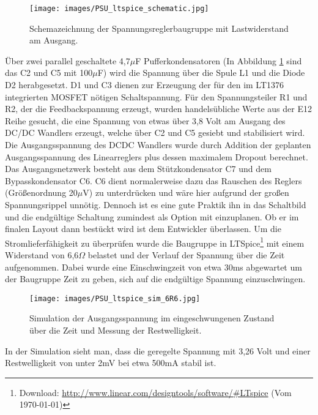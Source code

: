 \documentclass{scrartcl}
\begin{document}
\begin{figure}[h]
\texttt{[image: images/PSU\_ltspice\_schematic.jpg]}
\hspace{-14pt}
\caption{Schemazeichnung der Spannungsreglerbaugruppe mit Lastwiderstand am Ausgang.}
\label{ltspice}
\end{figure}
Über zwei parallel geschaltete 4,7$\mu$F Pufferkondensatoren (In Abbildung \ref{ltspice} sind das C2 und C5 mit 100$\mu$F) wird die Spannung über die Spule L1 und die Diode D2 herabgesetzt. D1 und C3 dienen zur Erzeugung der für den im LT1376 integrierten MOSFET nötigen Schaltspannung.
Für den Spannungsteiler R1 und R2, der die Feedbackspannung erzeugt, wurden handelsübliche Werte aus der E12 Reihe gesucht, die eine Spannung von etwas über 3,8 Volt am Ausgang des DC/DC Wandlers erzeugt, welche über C2 und C5 gesiebt und stabilisiert wird. Die Ausgangsspannung des DCDC Wandlers wurde durch Addition der geplanten Ausgangsspannung des Linearreglers plus dessen maximalem Dropout berechnet. Das Ausgangsnetzwerk besteht aus dem Stützkondensator C7 und dem Bypasskondensator C6. C6 dient normalerweise dazu das Rauschen des Reglers (Größenordnung 20$\mu$V) zu unterdrücken und wäre hier aufgrund der großen Spannungsrippel unnötig. Dennoch ist es eine gute Praktik ihn in das Schaltbild und die endgültige Schaltung zumindest als Option mit einzuplanen. Ob er im finalen Layout dann bestückt wird ist dem Entwickler überlassen. \newline
Um die Stromlieferfähigkeit zu überprüfen wurde die Baugruppe in LTSpice\footnote{Download: \url{http://www.linear.com/designtools/software/\#LTspice} (Vom \today)} mit einem Widerstand von 6,6$\Omega$ belastet und der Verlauf der Spannung über die Zeit aufgenommen. Dabei wurde eine Einschwingzeit von etwa 30ms abgewartet um der Baugruppe Zeit zu geben, sich auf die endgültige Spannung einzuschwingen.
\begin{figure}[h]
\texttt{[image: images/PSU\_ltspice\_sim\_6R6.jpg]}
\hspace{-14pt}
\caption{Simulation der Ausgangsspannung im eingeschwungenen Zustand über die Zeit und Messung der Restwelligkeit.}
\end{figure}

In der Simulation sieht man, dass die geregelte Spannung mit 3,26 Volt und einer Restwelligkeit von unter 2mV bei etwa 500mA stabil ist. \newline
\end{document}
